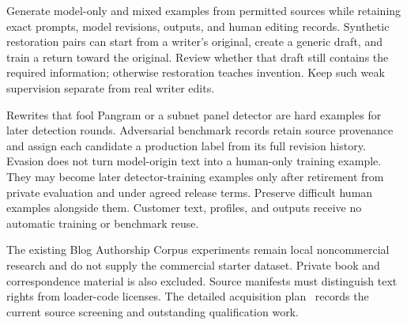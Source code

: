 Generate model-only and mixed examples from permitted sources while
retaining exact prompts, model revisions, outputs, and human editing
records. Synthetic restoration pairs can start from a writer's original,
create a generic draft, and train a return toward the original. Review
whether that draft still contains the required information; otherwise
restoration teaches invention. Keep such weak supervision separate from
real writer edits.

Rewrites that fool Pangram or a subnet panel detector are hard
examples for later detection rounds. Adversarial benchmark records retain
source provenance and assign each candidate a production label from its
full revision history. Evasion does not turn model-origin
text into a human-only training example.
They may become later detector-training examples only after retirement
from private evaluation and under agreed release terms. Preserve
difficult human examples alongside them. Customer text, profiles, and
outputs receive no automatic training or benchmark reuse.

The existing Blog Authorship Corpus experiments remain local
noncommercial research and do not supply the commercial starter dataset.
Private book and correspondence material is also excluded. Source
manifests must distinguish text rights from loader-code licenses. The
detailed
acquisition plan~\cite{trainingplan} records the current source screening and outstanding qualification
work.
